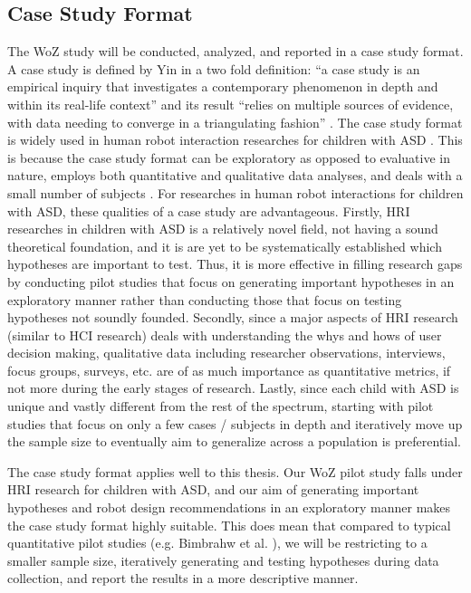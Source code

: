 \subsection{Case Study Format}
The WoZ study will be conducted, analyzed, and reported in a case study format.  A case study is defined by Yin in a two fold definition: ``a case study is an empirical inquiry that investigates a contemporary phenomenon in depth and within its real-life context'' and its result ``relies on multiple sources of evidence, with data needing to converge in a triangulating fashion'' \cite{yin2013case}.  The case study format is widely used in human robot interaction researches for children with ASD \cite{kozima2005interactive, robins2004robot, robins2009isolation}.  This is because the case study format can be exploratory as opposed to evaluative in nature, employs both quantitative and qualitative data analyses, and deals with a small number of subjects \cite{yin2013case}.  For researches in human robot interactions for children with ASD, these qualities of a case study are advantageous.  Firstly, HRI researches in children with ASD is a relatively novel field, not having a sound theoretical foundation, and it is are yet to be systematically established which hypotheses are important to test.  Thus, it is more effective in filling research gaps by conducting pilot studies that focus on generating important hypotheses in an exploratory manner rather than conducting those that focus on testing hypotheses not soundly founded.  Secondly, since a major aspects of HRI research (similar to HCI research) deals with understanding the whys and hows of user decision making, qualitative data including researcher observations, interviews, focus groups, surveys, etc. are of as much importance as quantitative metrics, if not more during the early stages of research.  Lastly, since each child with ASD is unique and vastly different from the rest of the spectrum, starting with pilot studies that focus on only a few cases / subjects in depth and iteratively move up the sample size to eventually aim to generalize across a population is preferential.

The case study format applies well to this thesis.  Our WoZ pilot study falls under HRI research for children with ASD, and our aim of generating important hypotheses and robot design recommendations in an exploratory manner makes the case study format highly suitable.  This does mean that compared to typical quantitative pilot studies (e.g. Bimbrahw et al. \cite{bimbrahw2012investigating}), we will be restricting to a smaller sample size, iteratively generating and testing hypotheses during data collection, and report the results in a more descriptive manner.

